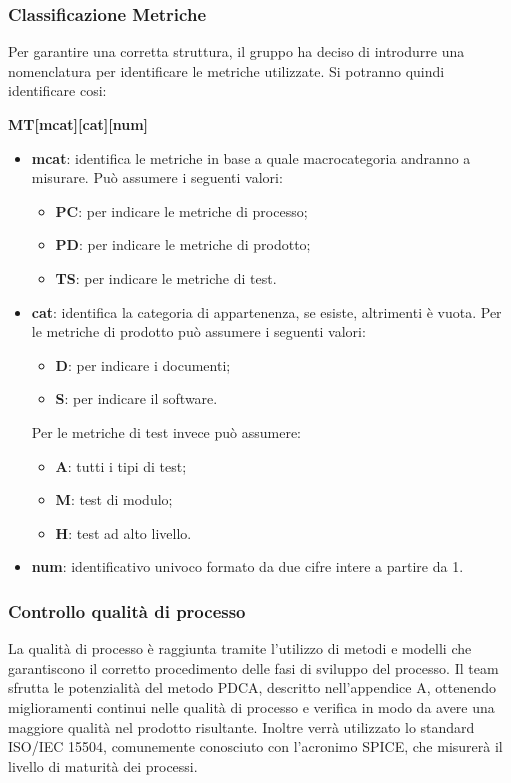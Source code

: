 \subsubsection{Classificazione Metriche}
Per garantire una corretta struttura, il gruppo ha deciso di introdurre una nomenclatura per identificare le metriche utilizzate. Si potranno quindi identificare cosi:
\begin{center}
	\textbf{MT[mcat][cat][num]}
\end{center}
\begin{itemize}
		\item \textbf{mcat}: identifica le metriche in base a quale macrocategoria andranno a misurare. Può assumere i seguenti valori:
	\begin{itemize}
		\item \textbf{PC}: per indicare le metriche di processo;
		\item \textbf{PD}: per indicare le metriche di prodotto;
		\item \textbf{TS}: per indicare le metriche di test.
	\end{itemize}
	\item \textbf{cat}: identifica la categoria di appartenenza, se esiste, altrimenti è vuota. Per le metriche di prodotto può assumere i seguenti valori:
	\begin{itemize}
		\item \textbf{D}: per indicare i documenti;
		\item \textbf{S}: per indicare il software.
	\end{itemize}
	Per le metriche di test invece può assumere:
	\begin{itemize}
		\item \textbf{A}: tutti i tipi di test;
		\item \textbf{M}: test di modulo;
		\item \textbf{H}: test ad alto livello.
	\end{itemize}
	\item \textbf{num}: identificativo univoco formato da due cifre intere a partire da 1.
\end{itemize}

\subsubsection{Controllo qualità di processo}
La qualità di processo è raggiunta tramite l'utilizzo di metodi e modelli che garantiscono il corretto procedimento delle fasi di sviluppo del processo. Il team sfrutta le potenzialità del metodo PDCA, descritto nell'appendice A, ottenendo miglioramenti continui nelle qualità di processo e verifica in modo da avere una maggiore qualità nel prodotto risultante. Inoltre verrà utilizzato lo standard ISO/IEC 15504, comunemente conosciuto con l'acronimo SPICE, che misurerà il livello di maturità dei processi.

